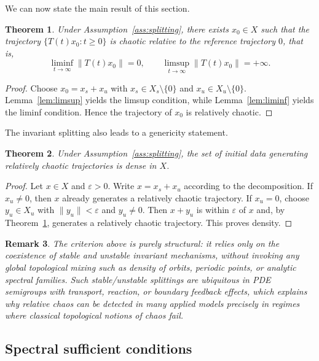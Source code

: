 \documentclass[12pt]{article}
\newtheorem{theorem}{Theorem}[section]
\newtheorem{remark}[theorem]{Remark}
\begin{document}
We can now state the main result of this section.

\begin{theorem}\label{thm:existence_rel_abstract}
Under Assumption~\ref{ass:splitting}, there exists $x_0\in X$ such that the trajectory $\{T(t)x_0:t\ge 0\}$ is chaotic relative to the reference trajectory $0$, that is,
\[
\liminf_{t\to\infty}\|T(t)x_0\|=0,
\qquad
\limsup_{t\to\infty}\|T(t)x_0\|=+\infty.
\]
\end{theorem}

\begin{proof}
Choose $x_0=x_s+x_u$ with $x_s\in X_s\setminus\{0\}$ and
$x_u\in X_u\setminus\{0\}$. Lemma~\ref{lem:limsup} yields the limsup condition, while Lemma~\ref{lem:liminf} yields the liminf condition. Hence the trajectory of $x_0$ is relatively chaotic.
\end{proof}

The invariant splitting also leads to a genericity statement.

\begin{theorem}\label{thm:generic_rel}
Under Assumption~\ref{ass:splitting}, the set of initial data generating relatively chaotic trajectories is dense in $X$.
\end{theorem}

\begin{proof}
Let $x\in X$ and $\varepsilon>0$. Write $x=x_s+x_u$ according to the decomposition. If $x_u\neq 0$, then $x$ already generates a relatively chaotic trajectory. If $x_u=0$, choose $y_u\in X_u$ with $\|y_u\|<\varepsilon$ and $y_u\neq 0$. Then $x+y_u$ is within $\varepsilon$ of $x$ and, by Theorem~\ref{thm:existence_rel_abstract}, generates a relatively chaotic trajectory. This proves density.
\end{proof}

\begin{remark}
The criterion above is purely structural: it relies only on the coexistence of stable and unstable invariant mechanisms, without invoking any global topological mixing such as density of orbits, periodic points, or analytic spectral families. Such stable/unstable splittings are ubiquitous in PDE semigroups with transport, reaction, or boundary feedback effects, which explains why relative chaos can be detected in many applied models precisely in regimes where classical topological notions of chaos fail.
\end{remark}

\subsection{Spectral sufficient conditions}
\end{document}
